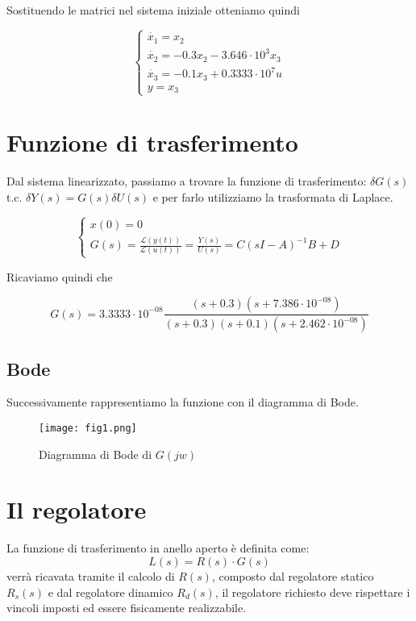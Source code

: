 \documentclass{article}
\begin{document}
Sostituendo le matrici nel sistema iniziale otteniamo quindi
\begin{large}
\[
\begin{cases}
\dot{x_1}=x_2\\
\dot{x_2}=-0.3x_2-3.646\cdot10^3 x_3\\
\dot{x_3}=-0.1 x_3+0.3333\cdot10^7 u\\
y=x_3
\end{cases}
\]
\end{large}

\section{Funzione di trasferimento}
Dal sistema linearizzato, passiamo a trovare la funzione di trasferimento: $\delta G(s)$ t.c. $\delta{Y} (s) = G(s)\delta{U} (s)$ e per farlo utilizziamo la trasformata di Laplace.

\begin{large}
\[
\begin{cases}
x(0)=0 \\
G(s)=\frac{\mathcal{L}(y(t))}{\mathcal{L}(u(t))}=\frac{Y(s)}{U(s)}=C(sI-A)^{-1} B +D
\end{cases}
\]
\end{large}

Ricaviamo quindi che
\begin{large}
\[
G(s) = 3.3333\cdot 10^{-08}\frac{(s+0.3) (s+7.386\cdot 10^{-08})} {(s+0.3) (s+0.1) (s+2.462\cdot 10^{-08})}
\]
\end{large}



\subsection{Bode}

Successivamente rappresentiamo la funzione con il diagramma di Bode.

\begin{figure}[!h]
\centering
\texttt{[image: fig1.png]}
\caption{\label{fig:bode}Diagramma di Bode di $G(jw)$}
\end{figure}

\section{Il regolatore}
La funzione di trasferimento in anello aperto è definita come:
\[ L(s) = R(s) \cdot G(s)  \]
verrà ricavata tramite il calcolo di $R(s)$, composto dal regolatore statico $R_s(s)$ e dal regolatore dinamico $R_d(s)$, il regolatore richiesto deve rispettare i vincoli imposti ed essere fisicamente realizzabile.
\end{document}
